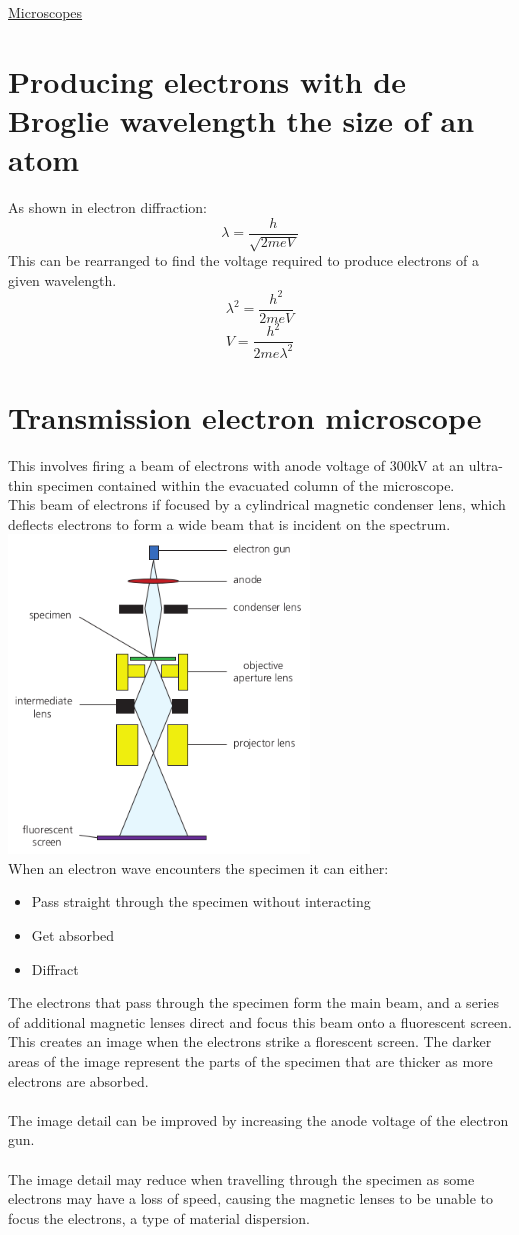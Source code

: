 \documentclass[12pt]{article}
\begin{document}
\begin{center}
\underline{\huge Microscopes}
\end{center}
\section{Producing electrons with de Broglie wavelength the size of an atom}
As shown in electron diffraction:
$$\lambda=\frac{h}{\sqrt{2meV}}$$
This can be rearranged to find the voltage required to produce electrons of a given wavelength. 
$$\lambda^2=\frac{h^2}{2meV}$$
$$V=\frac{h^2}{2me\lambda^2}$$
\section{Transmission electron microscope}
This involves firing a beam of electrons with anode voltage of 300kV at an ultra-thin specimen contained within the evacuated column of the microscope.\\
This beam of electrons if focused by a cylindrical magnetic condenser lens, which deflects electrons to form a wide beam that is incident on the spectrum.\\
\includegraphics[width=8cm]{tem.png}\\
When an electron wave encounters the specimen it can either:
\begin{itemize}
\item Pass straight through the specimen without interacting
\item Get absorbed
\item Diffract
\end{itemize}
The electrons that pass through the specimen form the main beam, and a series of additional magnetic lenses direct and focus this beam onto a fluorescent screen. This creates an image when the electrons strike a florescent screen. The darker areas of the image represent the parts of the specimen that are thicker as more electrons are absorbed.\\
\\
The image detail can be improved by increasing the anode voltage of the electron gun.\\
\\
The image detail may reduce when travelling through the specimen as some electrons may have a loss of speed, causing the magnetic lenses to be unable to focus the electrons, a type of material dispersion.\newpage
\end{document}
